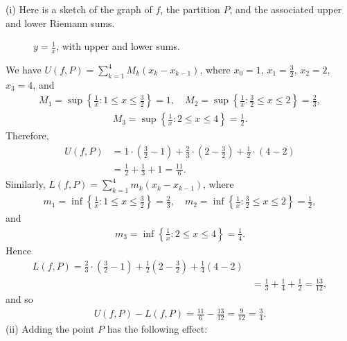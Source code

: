 \documentclass[letterpaper,10pt,english]{jupyterBook}
\let\sphinxpxdimen\pdfpxdimen\else\newdimen\sphinxpxdimen
\begin{document}
\sphinxAtStartPar
(i) Here is a sketch of the graph of \(f\), the partition \(P\), and the associated upper and lower Riemann sums.

\begin{figure}[htbp]
\centering
\capstart

\noindent\sphinxincludegraphics[width=600\sphinxpxdimen]{{int1i}.png}
\caption{\(y=\frac{1}{x}\), with upper and lower sums.}\label{\detokenize{Solutions-full:q64i}}\end{figure}

\sphinxAtStartPar
We have \(U(f,P) = \sum_{k=1}^4M_k(x_k-x_{k-1})\), where \(x_0=1\), \(x_1=\frac{3}{2}\), \(x_2=2\), \(x_3=4\), and
\begin{equation*}
\begin{split}
M_1=\sup\left\{\frac{1}{x}:1\leq x\leq\frac{3}{2}\right\}=1, \hspace{1em} M_2=\sup\left\{\frac{1}{x}:\frac{3}{2}\leq x\leq 2\right\}=\frac{2}{3},
\end{split}
\end{equation*}\begin{equation*}
\begin{split}
M_3=\sup\left\{\frac{1}{x}:2\leq x\leq 4\right\}=\frac{1}{2}.
\end{split}
\end{equation*}
\sphinxAtStartPar
Therefore,
\begin{align*}
U(f,P) &= 1\cdot\left(\frac{3}{2}-1\right) + \frac{2}{3}\cdot\left(2-\frac{3}{2}\right) + \frac{1}{2}\cdot(4-2) \\
&= \frac{1}{2} + \frac{1}{3} + 1 = \frac{11}{6}.
\end{align*}
\sphinxAtStartPar
Similarly, \(L(f,P) = \sum_{k=1}^4m_k(x_k-x_{k-1})\), where
\begin{equation*}
\begin{split}
m_1=\inf\left\{\frac{1}{x}:1\leq x\leq\frac{3}{2}\right\}=\frac{2}{3}, \hspace{1em} m_2=\inf\left\{\frac{1}{x}:\frac{3}{2}\leq x\leq 2\right\}=\frac{1}{2},
\end{split}
\end{equation*}
\sphinxAtStartPar
and
\begin{equation*}
\begin{split}
m_3=\inf\left\{\frac{1}{x}:2\leq x\leq 4\right\}=\frac{1}{4}.
\end{split}
\end{equation*}
\sphinxAtStartPar
Hence
\begin{align*}
L(f,P) = \frac{2}{3}\cdot\left(\frac{3}{2}-1\right) + \frac{1}{2}\left(2-\frac{3}{2}\right) + \frac{1}{4}(4-2) \\
&= \frac{1}{3} + \frac{1}{4} + \frac{1}{2} = \frac{13}{12},
\end{align*}
\sphinxAtStartPar
and so
\begin{equation*}
\begin{split}
U(f,P)-L(f,P) = \frac{11}{6}-\frac{13}{12} = \frac{9}{12} = \frac{3}{4}.
\end{split}
\end{equation*}
\sphinxAtStartPar
(ii) Adding the point \(P\) has the following effect:
\end{document}

